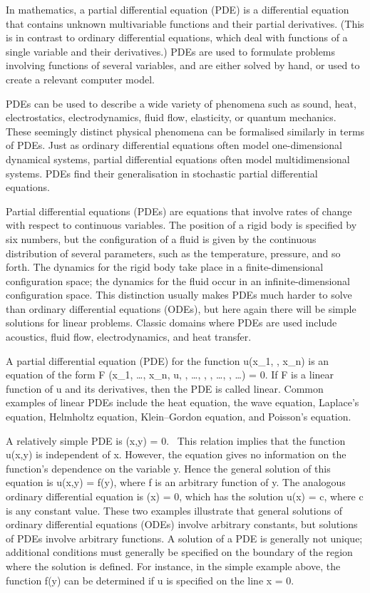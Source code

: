 In mathematics, a partial differential equation (PDE) is a differential equation that contains unknown multivariable functions and their partial derivatives. (This is in contrast to ordinary differential equations, which deal with functions of a single variable and their derivatives.) PDEs are used to formulate problems involving functions of several variables, and are either solved by hand, or used to create a relevant computer model.

PDEs can be used to describe a wide variety of phenomena such as sound, heat, electrostatics, electrodynamics, fluid flow, elasticity, or quantum mechanics. These seemingly distinct physical phenomena can be formalised similarly in terms of PDEs. Just as ordinary differential equations often model one-dimensional dynamical systems, partial differential equations often model multidimensional systems. PDEs find their generalisation in stochastic partial differential equations.


Partial differential equations (PDEs) are equations that involve rates of change with respect to continuous variables. The position of a rigid body is specified by six numbers, but the configuration of a fluid is given by the continuous distribution of several parameters, such as the temperature, pressure, and so forth. The dynamics for the rigid body take place in a finite-dimensional configuration space; the dynamics for the ﬂuid occur in an infinite-dimensional conﬁguration space. This distinction usually makes PDEs much harder to solve than ordinary differential equations (ODEs), but here again there will be simple solutions for linear problems. Classic domains where PDEs are used include acoustics, fluid flow, electrodynamics, and heat transfer.

A partial differential equation (PDE) for the function u(x_1, \cdots, x_n) is an equation of the form
F \left (x_1, \ldots, x_n, u, , \ldots, , , \ldots, , \ldots \right) = 0.
If F is a linear function of u and its derivatives, then the PDE is called linear. Common examples of linear PDEs include the heat equation, the wave equation, Laplace's equation, Helmholtz equation, Klein–Gordon equation, and Poisson's equation.

A relatively simple PDE is
(x,y) = 0.~
This relation implies that the function u(x,y) is independent of x. However, the equation gives no information on the function's dependence on the variable y. Hence the general solution of this equation is
u(x,y) = f(y),
where f is an arbitrary function of y. The analogous ordinary differential equation is
(x) = 0,
which has the solution
u(x) = c,
where c is any constant value. These two examples illustrate that general solutions of ordinary differential equations (ODEs) involve arbitrary constants, but solutions of PDEs involve arbitrary functions. A solution of a PDE is generally not unique; additional conditions must generally be specified on the boundary of the region where the solution is defined. For instance, in the simple example above, the function f(y) can be determined if u is specified on the line x = 0.

